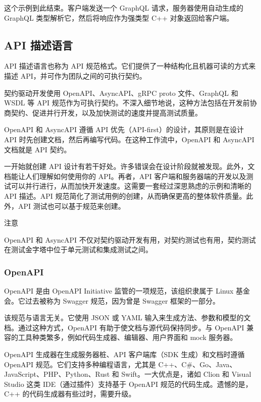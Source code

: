 \label{idx:1658}
\label{idx:1659}
这个示例到此结束。客户端发送一个 GraphQL 请求，服务器使用自动生成的 GraphQL 类型解析它，然后将响应作为强类型 C++ 对象返回给客户端。

\subsection{API 描述语言}

\label{idx:1660}
API 描述语言也称为 API 规范格式。它们提供了一种结构化且机器可读的方式来描述 API，并可作为团队之间的可执行契约。

契约驱动开发使用 OpenAPI、AsyncAPI、gRPC proto 文件、GraphQL 和 WSDL 等 API 规范作为可执行契约。不深入细节地说，这种方法包括在开发前协商契约、促进并行开发，以及加快测试的速度并提高测试质量。

\label{idx:1661}
OpenAPI 和 AsyncAPI 遵循 API 优先（API-first）的设计，其原则是在设计 API 时先创建文档，然后再编写代码。在这种工作流中，OpenAPI 和 AsyncAPI 文档就是 API 契约。

\label{idx:1662}
一开始就创建 API 设计有若干好处。许多错误会在设计阶段就被发现。此外，文档能让人们理解如何使用你的 API。再者，API 客户端和服务器端的开发以及测试可以并行进行，从而加快开发速度。这需要一套经过深思熟虑的示例和清晰的 API 描述。API 规范简化了测试用例的创建，从而确保更高的整体软件质量。此外，API 测试也可以基于规范来创建。

\begin{myNotic}{注意}

OpenAPI 和 AsyncAPI 不仅对契约驱动开发有用，对契约测试也有用，契约测试在测试金字塔中位于单元测试和集成测试之间。
\end{myNotic}

\subsubsection{OpenAPI}

\label{idx:1663}
\label{idx:1664}
OpenAPI 是由 OpenAPI Initiative 监管的一项规范，该组织隶属于 Linux 基金会。它过去被称为 Swagger 规范，因为曾是 Swagger 框架的一部分。

\label{idx:1665}
该规范与语言无关。它使用 JSON 或 YAML 输入来生成方法、参数和模型的文档。通过这种方式，OpenAPI 有助于使文档与源代码保持同步。与 OpenAPI 兼容的工具种类繁多，例如代码生成器、编辑器、用户界面和 mock 服务器。

OpenAPI 生成器在生成服务器桩、API 客户端库（SDK 生成）和文档时遵循 OpenAPI 规范。它们支持多种编程语言，尤其是 C++、C\#、Go、Java、JavaScript、PHP、Python、Rust 和 Swift。一大优点是，诸如 Clion 和 Visual Studio 这类 IDE（通过插件）支持基于 OpenAPI 规范的代码生成。遗憾的是，C++ 的代码生成器有些过时，需要升级。

